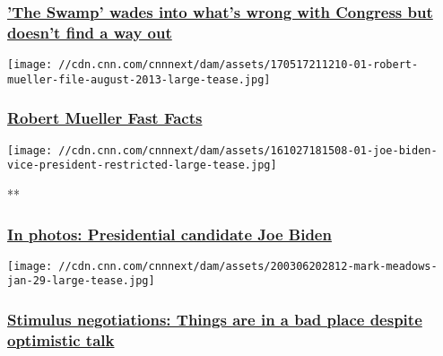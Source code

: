 \hypertarget{the-swamp-wades-into-whats-wrong-with-congress-but-doesnt-find-a-way-out}{%
\subsubsection{\texorpdfstring{\href{/2020/08/03/entertainment/the-swamp-review/index.html}{'The
Swamp' wades into what's wrong with Congress but doesn't find a way
out}}{'The Swamp' wades into what's wrong with Congress but doesn't find a way out}}\label{the-swamp-wades-into-whats-wrong-with-congress-but-doesnt-find-a-way-out}}

\href{/2018/04/16/us/robert-mueller-fast-facts/index.html}{}

\texttt{[image: //cdn.cnn.com/cnnnext/dam/assets/170517211210-01-robert-mueller-file-august-2013-large-tease.jpg]}

\hypertarget{robert-mueller-fast-facts}{%
\subsubsection{\texorpdfstring{\href{/2018/04/16/us/robert-mueller-fast-facts/index.html}{Robert
Mueller Fast
Facts}}{Robert Mueller Fast Facts}}\label{robert-mueller-fast-facts}}

\href{/2016/12/06/politics/gallery/biden-vice-presidency/index.html}{}

\texttt{[image: //cdn.cnn.com/cnnnext/dam/assets/161027181508-01-joe-biden-vice-president-restricted-large-tease.jpg]}

**

\hypertarget{in-photos-presidential-candidate-joe-biden}{%
\subsubsection{\texorpdfstring{\href{/2016/12/06/politics/gallery/biden-vice-presidency/index.html}{In
photos: Presidential candidate Joe
Biden}}{In photos: Presidential candidate Joe Biden}}\label{in-photos-presidential-candidate-joe-biden}}

\href{/2020/08/03/politics/stimulus-negotiations-state-of-play/index.html}{}

\texttt{[image: //cdn.cnn.com/cnnnext/dam/assets/200306202812-mark-meadows-jan-29-large-tease.jpg]}

\hypertarget{stimulus-negotiations-things-are-in-a-bad-place-despite-optimistic-talk}{%
\subsubsection{\texorpdfstring{\href{/2020/08/03/politics/stimulus-negotiations-state-of-play/index.html}{Stimulus
negotiations: Things are in a bad place despite optimistic
talk}}{Stimulus negotiations: Things are in a bad place despite optimistic talk}}\label{stimulus-negotiations-things-are-in-a-bad-place-despite-optimistic-talk}}

